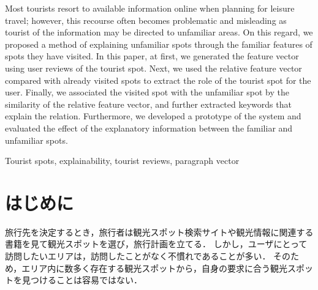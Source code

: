 \documentclass[submit]{ipsj}
\begin{document}
\begin{eabstract}
Most tourists resort to available information online when planning for leisure travel; however, this recourse often becomes problematic and misleading as tourist of the information may be directed to unfamiliar areas.
On this regard, we proposed a method of explaining unfamiliar spots through the familiar features of spots they have visited.
In this paper, at first, we generated the feature vector using user reviews of the tourist spot.
Next, we used the relative feature vector compared with already visited spots to extract the role of the tourist spot for the user.
Finally, we associated the visited spot with the unfamiliar spot by the similarity of the relative feature vector, and further extracted keywords that explain the relation.
Furthermore, we developed a prototype of the system and evaluated the effect of the explanatory information between the familiar and unfamiliar spots.
\end{eabstract}

\begin{ekeyword}
Tourist spots, explainability, tourist reviews, paragraph vector
\end{ekeyword}

\maketitle

\section{はじめに}

旅行先を決定するとき，旅行者は観光スポット検索サイトや観光情報に関連する書籍を見て観光スポットを選び，旅行計画を立てる．
しかし，ユーザにとって訪問したいエリアは，訪問したことがなく不慣れであることが多い．
そのため，エリア内に数多く存在する観光スポットから，自身の要求に合う観光スポットを見つけることは容易ではない．
\end{document}
